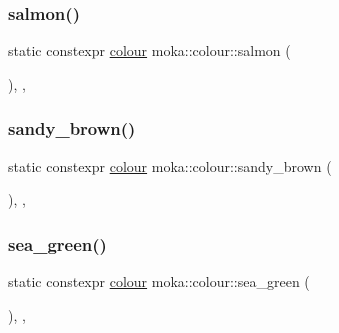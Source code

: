 \mbox{\label{classmoka_1_1colour_a5213e584147379ed6803a9ea7de6152c}} 
\subsubsection{\texorpdfstring{salmon()}{salmon()}}
{\footnotesize\ttfamily static constexpr \mbox{\hyperlink{classmoka_1_1colour}{colour}} moka\+::colour\+::salmon (\begin{DoxyParamCaption}{ }\end{DoxyParamCaption})\hspace{0.3cm}{\ttfamily [inline]}, {\ttfamily [static]}, {\ttfamily [noexcept]}}

\mbox{\label{classmoka_1_1colour_aa4464dcfc58ddc719455407163d27f73}} 
\subsubsection{\texorpdfstring{sandy\_brown()}{sandy\_brown()}}
{\footnotesize\ttfamily static constexpr \mbox{\hyperlink{classmoka_1_1colour}{colour}} moka\+::colour\+::sandy\+\_\+brown (\begin{DoxyParamCaption}{ }\end{DoxyParamCaption})\hspace{0.3cm}{\ttfamily [inline]}, {\ttfamily [static]}, {\ttfamily [noexcept]}}

\mbox{\label{classmoka_1_1colour_ae0921dee800efb04f5c29391125860bf}} 
\subsubsection{\texorpdfstring{sea\_green()}{sea\_green()}}
{\footnotesize\ttfamily static constexpr \mbox{\hyperlink{classmoka_1_1colour}{colour}} moka\+::colour\+::sea\+\_\+green (\begin{DoxyParamCaption}{ }\end{DoxyParamCaption})\hspace{0.3cm}{\ttfamily [inline]}, {\ttfamily [static]}, {\ttfamily [noexcept]}}

